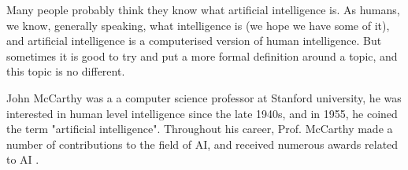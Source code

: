 \documentclass[conference]{IEEEtran}
\begin{document}

Many people probably think they know what artificial intelligence is. As humans, we know, generally speaking, what intelligence is (we hope we have some of it), and artificial intelligence is a computerised version of human intelligence. But sometimes it is good to try and put a more formal definition around a topic, and this topic is no different. 

John McCarthy was a a computer science professor at Stanford university, he was interested in human level intelligence since the late 1940s, and in 1955, he coined the term "artificial intelligence". Throughout his career, Prof. McCarthy made a number of contributions to the field of AI, and received numerous awards related to AI \cite{mccarthy1}. 
\end{document}
